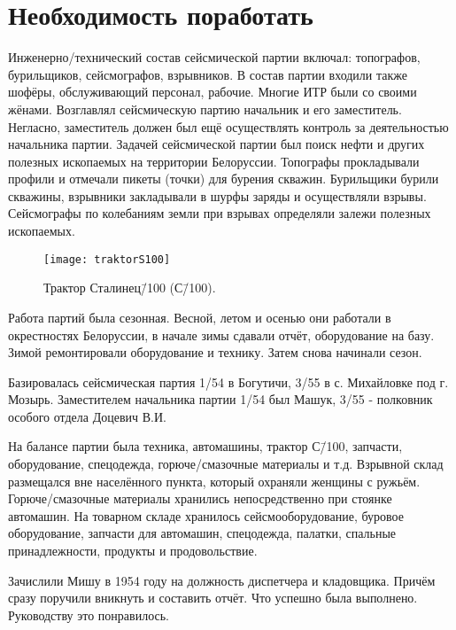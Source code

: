 ﻿\chapter{Необходимость поработать}

Инженерно\-/технический состав сейсмической партии включал: топографов, бурильщиков, сейсмографов, взрывников. В состав партии входили также шофёры, обслуживающий персонал, рабочие. Многие ИТР были со своими жёнами. Возглавлял сейсмическую партию начальник и его заместитель. Негласно, заместитель должен был ещё осуществлять контроль за деятельностью начальника партии. Задачей сейсмической партии был поиск нефти и других полезных ископаемых на территории Белоруссии. Топографы прокладывали профили и отмечали пикеты (точки) для бурения скважин. Бурильщики бурили скважины, взрывники закладывали в шурфы заряды и осуществляли взрывы. Сейсмографы по колебаниям земли при взрывах определяли залежи полезных ископаемых.

\begin{wrapfigure}{O}{.4\textwidth}
\centering
\texttt{[image: traktorS100]}
\caption[Трактор Сталинец\=/100 (С\=/100).]{Трактор Сталинец\=/100 (С\=/100)\footnotemark.}
\label{fig:traktorS100}
\end{wrapfigure}

Работа партий была сезонная. Весной, летом и осенью они работали в окрестностях Белоруссии, в начале зимы сдавали отчёт, оборудование на базу. Зимой ремонтировали оборудование и технику. Затем снова начинали сезон.

Базировалась сейсмическая партия 1/54 в Богутичи, 3/55 в с. Михайловке под г. Мозырь. Заместителем начальника партии 1/54 был Машук, 3/55 - полковник особого отдела Доцевич В.И.

На балансе партии была техника, автомашины, трактор С\=/100, запчасти, оборудование, спецодежда, горюче\-/смазочные материалы и т.д. Взрывной склад размещался вне населённого пункта, который охраняли женщины с ружьём. Горюче\-/смазочные материалы хранились непосредственно при стоянке автомашин. На товарном складе хранилось сейсмооборудование, буровое оборудование, запчасти для автомашин, спецодежда, палатки, спальные принадлежности, продукты и продовольствие.

Зачислили Мишу в 1954 году на должность диспетчера и кладовщика. Причём сразу поручили вникнуть и составить отчёт. Что успешно была выполнено. Руководству это понравилось.

